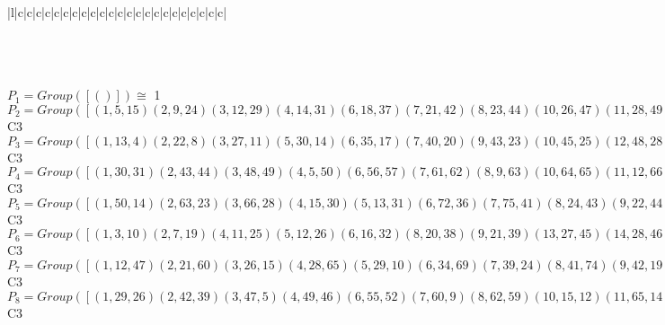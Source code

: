 \documentclass[varwidth=\maxdimen,border=10]{standalone}
\begin{document}
\begin{tabular}
\begin{array}{|l|c|c|c|c|c|c|c|c|c|c|c|c|c|c|c|c|c|c|c|c|c|c|c|}
\end{array}\)\\
\ \\
\ \\
$P_{1} = Group( [ () ] )\cong$ 1\ \\
$P_{2} = Group( [ ( 1, 5,15)( 2, 9,24)( 3,12,29)( 4,14,31)( 6,18,37)( 7,21,42)( 8,23,44)(10,26,47)(11,28,49)(13,30,50)(16,34,55)(17,36,57)(19,39,60)(20,41,62)(22,43,63)(25,46,65)(27,48,66)(32,52,69)(33,54,71)(35,56,72)(38,59,74)(40,61,75)(45,64,76)(51,68,78)(53,70,79)(58,73,80)(67,77,81) ] )\cong$ C3\ \\
$P_{3} = Group( [ ( 1,13, 4)( 2,22, 8)( 3,27,11)( 5,30,14)( 6,35,17)( 7,40,20)( 9,43,23)(10,45,25)(12,48,28)(15,50,31)(16,53,33)(18,56,36)(19,58,38)(21,61,41)(24,63,44)(26,64,46)(29,66,49)(32,67,51)(34,70,54)(37,72,57)(39,73,59)(42,75,62)(47,76,65)(52,77,68)(55,79,71)(60,80,74)(69,81,78) ] )\cong$ C3\ \\
$P_{4} = Group( [ ( 1,30,31)( 2,43,44)( 3,48,49)( 4, 5,50)( 6,56,57)( 7,61,62)( 8, 9,63)(10,64,65)(11,12,66)(13,14,15)(16,70,71)(17,18,72)(19,73,74)(20,21,75)(22,23,24)(25,26,76)(27,28,29)(32,77,78)(33,34,79)(35,36,37)(38,39,80)(40,41,42)(45,46,47)(51,52,81)(53,54,55)(58,59,60)(67,68,69) ] )\cong$ C3\ \\
$P_{5} = Group( [ ( 1,50,14)( 2,63,23)( 3,66,28)( 4,15,30)( 5,13,31)( 6,72,36)( 7,75,41)( 8,24,43)( 9,22,44)(10,76,46)(11,29,48)(12,27,49)(16,79,54)(17,37,56)(18,35,57)(19,80,59)(20,42,61)(21,40,62)(25,47,64)(26,45,65)(32,81,68)(33,55,70)(34,53,71)(38,60,73)(39,58,74)(51,69,77)(52,67,78) ] )\cong$ C3\ \\
$P_{6} = Group( [ ( 1, 3,10)( 2, 7,19)( 4,11,25)( 5,12,26)( 6,16,32)( 8,20,38)( 9,21,39)(13,27,45)(14,28,46)(15,29,47)(17,33,51)(18,34,52)(22,40,58)(23,41,59)(24,42,60)(30,48,64)(31,49,65)(35,53,67)(36,54,68)(37,55,69)(43,61,73)(44,62,74)(50,66,76)(56,70,77)(57,71,78)(63,75,80)(72,79,81) ] )\cong$ C3\ \\
$P_{7} = Group( [ ( 1,12,47)( 2,21,60)( 3,26,15)( 4,28,65)( 5,29,10)( 6,34,69)( 7,39,24)( 8,41,74)( 9,42,19)(11,46,31)(13,48,76)(14,49,25)(16,52,37)(17,54,78)(18,55,32)(20,59,44)(22,61,80)(23,62,38)(27,64,50)(30,66,45)(33,68,57)(35,70,81)(36,71,51)(40,73,63)(43,75,58)(53,77,72)(56,79,67) ] )\cong$ C3\ \\
$P_{8} = Group( [ ( 1,29,26)( 2,42,39)( 3,47, 5)( 4,49,46)( 6,55,52)( 7,60, 9)( 8,62,59)(10,15,12)(11,65,14)(13,66,64)(16,69,18)(17,71,68)(19,24,21)(20,74,23)(22,75,73)(25,31,28)(27,76,30)(32,37,34)(33,78,36)(35,79,77)(38,44,41)(40,80,43)(45,50,48)(51,57,54)(53,81,56)(58,63,61)(67,72,70) ] )\cong$ C3\ \\

\end{tabular}
\end{document}
